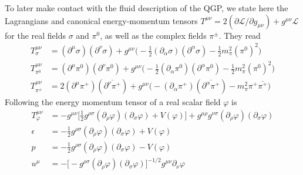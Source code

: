 To later make contact with the fluid description of the QGP, we state here the Lagrangians and canonical energy-momentum tensors ${T^{\mu\nu}=2(\partial\mathscr{L}/\partial g_{\mu\nu})+g^{\mu\nu}\mathscr{L}}$ \cite{Weinberg_2008} for the real fields $\sigma$ and $\pi^0$, as well as the complex fields $\pi^\pm$. They read
\begin{subequations}
    \begin{align}
        T^{\mu\nu}_{\sigma}&=(\partial^\mu\sigma)(\partial^\nu\sigma)+g^{\mu\nu}\big(-\frac{1}{2}(\partial_\alpha\sigma)(\partial^\alpha\sigma)-\frac{1}{2}m_\pi^2(\pi^0)^2\big)\\
        T^{\mu\nu}_{\pi^0}&=(\partial^\mu\pi^0)(\partial^\nu\pi^0)+g^{\mu\nu}\big(-\frac{1}{2}(\partial_\alpha\pi^0)(\partial^\alpha\pi^0)-\frac{1}{2}m_\pi^2(\pi^0)^2\big)\\
        T^{\mu\nu}_{\pi^\pm}&=2(\partial^\mu\pi^+)(\overline{\partial^\nu\pi^+})+g^{\mu\nu}\big(-(\partial_\alpha\pi^+)(\overline{\partial^\alpha\pi^+})-m_\pi^2\pi^+\overline{\pi^+}\big)
    \end{align}
\end{subequations}
Following \cite{Weinberg_2008} the energy momentum tensor of a real scalar field $\varphi$ is
\begin{subequations}
    \begin{align}
        T_\varphi^{\mu\nu}&=-g^{\mu\nu}\big[\frac{1}{2}g^{\rho\sigma}(\partial_\rho\varphi)(\partial_\sigma\varphi)+V(\varphi)\big]+g^{\mu\rho}g^{\nu\sigma}(\partial_\rho\varphi)(\partial_\sigma\varphi)\\
        \epsilon&=-\frac{1}{2}g^{\rho\sigma}(\partial_\rho\varphi)(\partial_\sigma\varphi)+V(\varphi)\\
        p&=-\frac{1}{2}g^{\rho\sigma}(\partial_\rho\varphi)(\partial_\sigma\varphi)-V(\varphi)\\
        u^\mu&=-\big[-g^{\rho\sigma}(\partial_\rho\varphi)(\partial_\sigma\varphi)\big]^{-1/2}g^{\mu\nu}\partial_\nu\varphi
    \end{align}
\end{subequations}

